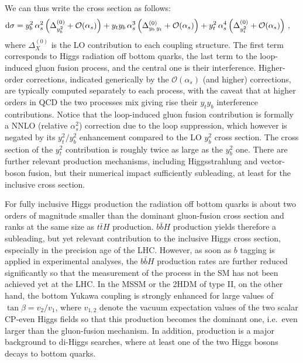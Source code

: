 \documentclass[11pt,a4paper]{article}
\begin{document}
We can thus write the \bbH{} cross section as follows:
\begin{equation}
\begin{split}
    {\rm d} \sigma & = y_b^2{}\,\alpha_s^2\left( \Delta_{y_b^2}^{(0)} + \mathcal O(\alpha_s) \right) +y_t y_b\, \alpha_s^3\left( \Delta_{y_b\, y_t}^{(0)} + \mathcal O(\alpha_s)  \right) + y_t^2{} \,\alpha_s^4\left( \Delta_{y_t^2}^{(0)} + \mathcal O(\alpha_s)  \right)\, ,
\end{split}
\label{eq:hbbxsec2}
\end{equation}
where $\Delta_{X}^{(0)}$ is the LO contribution to each coupling structure. The first term corresponds to Higgs radiation off bottom quarks, the last term
to the loop-induced gluon fusion process, and the central one is their interference. Higher-order corrections, indicated generically
by the $\mathcal O(\alpha_s)$ (and higher) corrections, 
are typically computed separately to each process, with the caveat that at higher orders in QCD the two processes mix giving rise 
their $y_t y_b$ interference contributions. Notice that the loop-induced gluon fusion contribution is formally a NNLO (relative $\alpha_s^2$) correction
due to the loop suppression, which however is negated by its $y_t^2/y_b^2$ enhancement compared to the LO $y_b^2$ cross section.
The cross section of the $y_t^2$ contribution is roughly twice as large as the $y_b^2$ one.
There are further relevant \bbH{} production mechanisms, including Higgsstrahlung and vector-boson fusion, 
but their numerical impact sufficiently subleading, at least for the inclusive cross section.

For fully inclusive Higgs production the radiation off bottom quarks is about two orders of magnitude smaller than the dominant gluon-fusion cross section and ranks at the same size as $t\bar tH$ production. $b\bar bH$ production yields therefore a subleading, but yet relevant 
contribution to the inclusive Higgs cross section, especially in the precision age of the LHC. However, as soon as $b$ tagging is applied 
in experimental analyses, the $b\bar bH$ production rates are further reduced significantly so that the measurement of the \bbH{} process in the 
SM has not been achieved yet at the LHC. In the MSSM or the 2HDM of type II, on the other hand, the bottom Yukawa coupling is strongly enhanced for large values of $\tan\beta = v_2/v_1$, where $v_{1,2}$ denote the vacuum expectation values of the two scalar CP-even Higgs fields so that this production becomes the
dominant one, i.e.\ even larger than the gluon-fusion mechanism. In addition, \bbH{} production is a major background to di-Higgs searches, where at least 
one of the two Higgs bosons decays to bottom quarks.
\end{document}
